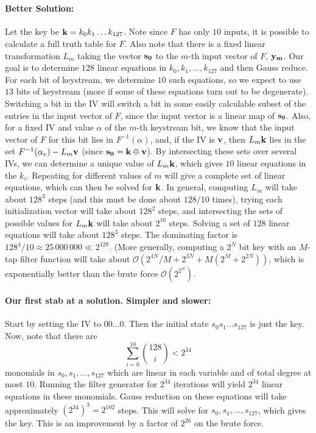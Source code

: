\ 
\paragraph{Better Solution: }
Let the key be ${\bf k}= k_0k_1\dots k_{127}$.
Note since $F$ has only $10$ inputs, it is possible to calculate a full truth
table for $F$. Also note that there is a fixed linear transformation $L_m$ taking
the vector ${\bf s_0}$ to the $m$-th input vector of $F$, ${\bf y_m}$. Our goal is to determine
$128$ linear equations in $k_0,k_1,\dots,k_{127}$ and then Gauss reduce. For each
bit of keystream, we determine $10$ such equations, so we expect to use $13$ bits
of keystream (more if some of these equations turn out to be degenerate). 
Switching a bit in the IV will switch a bit in some easily calculable
subset of the entries in the input vector of $F$, since the input vector is a
linear map of ${\bf s_0}$. Also, for a fixed IV and value $\alpha$
of the $m$-th keystream bit, we know that the input vector of $F$ for this bit
lies in $F^{-1}(\alpha)$, and, if the IV is ${\bf v}$, then $L_m{\bf k}$ lies in
the set $F^{-1}(\alpha_v)-L_m{\bf v}$ (since ${\bf s_0} ={\bf k} \oplus {\bf v}$).
By intersecting these sets over several IVs, we can determine a unique value of
$L_m{\bf k}$, which gives $10$ linear equations in the $k_i$. Repeating for different
values of $m$ will give a complete set of linear equations, which can then be solved
for ${\bf k}$. In general, computing $L_m$ will take about $128^3$ steps (and this
must be done about $128/10$ times), trying each
initialization vector will take about $128^2$ steps, and intersecting the sets of
possible values for $L_m{\bf k}$ will take about $2^{10}$ steps. Solving a set of
$128$ linear equations will take about $128^3$ steps. The dominating factor is 
$128^4/10 \approx 25\,000\,000 \ll 2^{128}$.
(More generally, computing a $2^N$ bit key with an $M$-tap filter
function will take about $\mathcal{O}(2^{4N}/M+2^{3N}+M(2^M+2^{2N}))$, which
is exponentially better than the brute force $\mathcal{O}(2^{2^N})$.

\paragraph{Our first stab at a solution. Simpler and slower:}
Start by setting the IV to $00\dots 0$. Then the initial state $s_0s_1\dots s_{127}$
is just the key. Now, note that there are 
\[ \sum_{i=0}^{10} {128 \choose i} <2^{34}\] monomials in $s_0,s_1, \dots, s_{127}$
which are linear in each variable and of total degree at most $10$. Running
the filter generator for $2^{34}$ iterations will yield $2^{34}$ linear equations
in these monomials. Gauss reduction on these equations will take approximately
$(2^{34})^3 = 2^{102}$ steps. This will solve for $s_0,s_1,\dots, s_{127}$, which
gives the key. This is an improvement by a factor of $2^{26}$ on the brute force.
